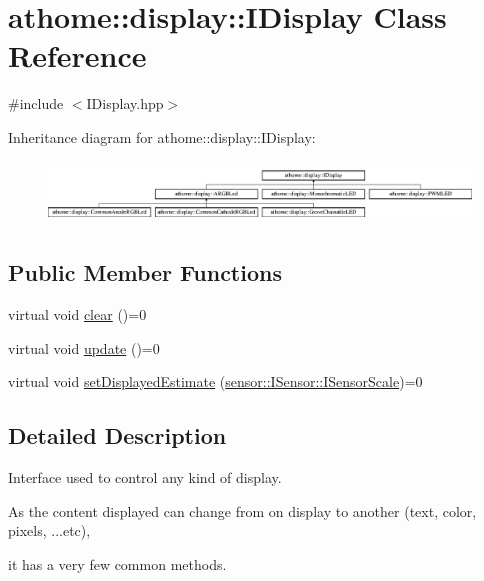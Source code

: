 \hypertarget{classathome_1_1display_1_1_i_display}{}\section{athome\+:\+:display\+:\+:I\+Display Class Reference}
\label{classathome_1_1display_1_1_i_display}


{\ttfamily \#include $<$I\+Display.\+hpp$>$}

Inheritance diagram for athome\+:\+:display\+:\+:I\+Display\+:\begin{figure}[H]
\begin{center}
\leavevmode
\includegraphics[height=1.660079cm]{classathome_1_1display_1_1_i_display}
\end{center}
\end{figure}
\subsection*{Public Member Functions}
\begin{DoxyCompactItemize}
\item 
virtual void \mbox{\hyperlink{classathome_1_1display_1_1_i_display_a0d3add1ce61c96657827fb56d250d9c6}{clear}} ()=0
\item 
virtual void \mbox{\hyperlink{classathome_1_1display_1_1_i_display_a4ba7bd5d46f88578f1c846f4f5f3c5d1}{update}} ()=0
\item 
virtual void \mbox{\hyperlink{classathome_1_1display_1_1_i_display_a3c9678f929e4bc04742d458b0c2399ef}{set\+Displayed\+Estimate}} (\mbox{\hyperlink{classathome_1_1sensor_1_1_i_sensor_aa70bc27a4c17c86caf96cca776541ddf}{sensor\+::\+I\+Sensor\+::\+I\+Sensor\+Scale}})=0
\end{DoxyCompactItemize}


\subsection{Detailed Description}
Interface used to control any kind of display.

As the content displayed can change from on display to another (text, color, pixels, ...etc),

it has a very few common methods.

